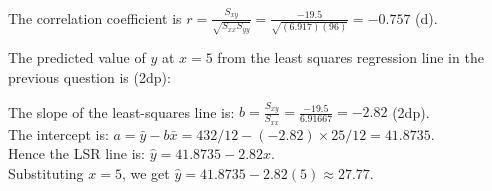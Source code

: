 \documentclass[bigtut]{tutorial}
\begin{document}
\begin{tutorial}
\begin{questions}
    
 \begin{solution}
The correlation coefficient is $r = \frac{S_{xy}}{\sqrt{S_{xx}S_{yy}}} = \frac{-19.5}{\sqrt{(6.917)(96)}} = -0.757$ (d).
    \end{solution}
    
    
  \question 
The predicted value of $y$ at $x=5$ from the least squares regression line in the previous question is (2dp):
    \begin{solution}
    The slope of the least-squares line is: $b = \frac{S_{xy}}{S_{xx}} = \frac{-19.5}{6.91667} = -2.82$  (2dp). \\
    The intercept is: $a=\bar y - b \bar x = 432/12 - (-2.82) \times 25/12= 41.8735$. \\
Hence the LSR line is: $\hat{y} =  41.8735 - 2.82x$. \\
Substituting $x=5$, we get  $\hat{y}=41.8735 - 2.82(5) \approx 27.77$.
    \end{solution}
 

\end{questions}
\end{tutorial}
\end{document}
